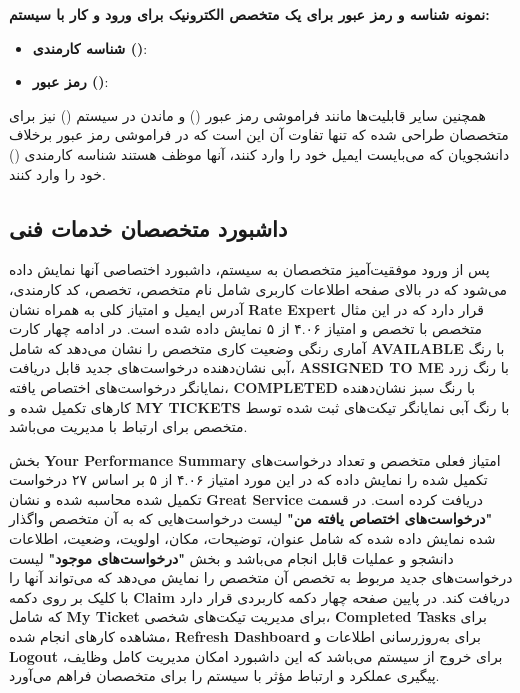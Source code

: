 \documentclass[12pt,a4paper]{report}
\begin{document}
	\textbf{نمونه شناسه و رمز عبور برای یک متخصص الکترونیک برای ورود و کار با سیستم:}
	\begin{itemize}
		\item \textbf{شناسه کارمندی ()}: 
		\item \textbf{رمز عبور ()}: 
	\end{itemize}
	
	همچنین سایر قابلیت‌ها مانند فراموشی رمز عبور () و ماندن در سیستم () نیز برای متخصصان طراحی شده که تنها تفاوت آن این است که در فراموشی رمز عبور برخلاف دانشجویان که می‌بایست ایمیل خود را وارد کنند، آنها موظف هستند شناسه کارمندی () خود را وارد کنند.
	
	\subsection{داشبورد متخصصان خدمات فنی}
	
	پس از ورود موفقیت‌آمیز متخصصان به سیستم، داشبورد اختصاصی آنها نمایش داده می‌شود که در بالای صفحه اطلاعات کاربری شامل نام متخصص، تخصص، کد کارمندی، آدرس ایمیل و امتیاز کلی به همراه نشان \textbf{Rate Expert} قرار دارد که در این مثال متخصص  با تخصص  و امتیاز ۴.۰۶ از ۵ نمایش داده شده است. در ادامه چهار کارت آماری رنگی وضعیت کاری متخصص را نشان می‌دهد که شامل \textbf{AVAILABLE} با رنگ آبی نشان‌دهنده درخواست‌های جدید قابل دریافت، \textbf{ASSIGNED TO ME} با رنگ زرد نمایانگر درخواست‌های اختصاص یافته، \textbf{COMPLETED} با رنگ سبز نشان‌دهنده کارهای تکمیل شده و \textbf{MY TICKETS} با رنگ آبی نمایانگر تیکت‌های ثبت شده توسط متخصص برای ارتباط با مدیریت می‌باشد.
	
	بخش \textbf{Your Performance Summary} امتیاز فعلی متخصص و تعداد درخواست‌های تکمیل شده را نمایش داده که در این مورد امتیاز ۴.۰۶ از ۵ بر اساس ۲۷ درخواست تکمیل شده محاسبه شده و نشان \textbf{Great Service} دریافت کرده است. در قسمت \textbf{"درخواست‌های اختصاص یافته من"} لیست درخواست‌هایی که به آن متخصص واگذار شده نمایش داده شده که شامل عنوان، توضیحات، مکان، اولویت، وضعیت، اطلاعات دانشجو و عملیات قابل انجام می‌باشد و بخش \textbf{"درخواست‌های موجود"} لیست درخواست‌های جدید مربوط به تخصص آن متخصص را نمایش می‌دهد که می‌تواند آنها را با کلیک بر روی دکمه \textbf{Claim} دریافت کند. در پایین صفحه چهار دکمه کاربردی قرار دارد که شامل \textbf{My Ticket} برای مدیریت تیکت‌های شخصی، \textbf{Completed Tasks} برای مشاهده کارهای انجام شده، \textbf{Refresh Dashboard} برای به‌روزرسانی اطلاعات و \textbf{Logout} برای خروج از سیستم می‌باشد که این داشبورد امکان مدیریت کامل وظایف، پیگیری عملکرد و ارتباط مؤثر با سیستم را برای متخصصان فراهم می‌آورد.
	
\end{document}
